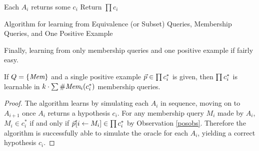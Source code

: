 \begin{algorithm}[H]
\label{lineqalg}
\SetAlgoLined
{}
Each $A_i$ returns some $c_i$\;
Return $\prod c_i$\;
\caption{Algorithm for learning from Equivalence (or Subset)  Queries, Membership Queries, and One Positive Example}
\end{algorithm}


Finally, learning from only membership queries and one positive example if fairly easy. 

\begin{proposition}
\label{memandpos}
If $Q = \{\emph{Mem}\}$ and a single positive example $\vec{p} \in \prod c^*_i$ is given, then $\prod c^*_i$ is learnable in $k \cdot \sum \#\emph{Mem}_{i}(c^*_i)$ membership queries. 
\end{proposition}
\begin{proof}
The algorithm learns by simulating each $A_i$ in sequence, moving on to $A_{i+1}$ once $A_i$ returns a hypothesis $c_i$. 
For any membership query $M_i$ made by $A_i$, $M_i \in c^*_i$ if and only if $\vec{p}[i \leftarrow M_i]\in \prod c^*_i$ by Observation \ref{posobs}. 
Therefore the algorithm is successfully able to simulate the oracle for each $A_i$, yielding a correct hypothesis $c_i$. 
\end{proof}
